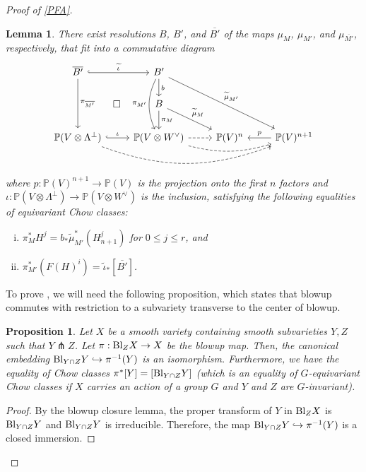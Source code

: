 \documentclass[12pt]{amsart}
\newcommand{\mb}{\mathbb}
\newcommand{\ol}{\overline}
\newcommand{\wt}{\widetilde}
\theoremstyle{plain}
\newtheorem{Lem}[Thm]{Lemma}
\newtheorem{Prop}[Thm]{Proposition}
\theoremstyle{definition}
\theoremstyle{remark}
\begin{document}
\begin{proof}[Proof of \cref{PFA}]
\begin{Lem} \label{pushforwardkeylemma}
There exist resolutions $B$, $B'$, and $\overline{B'}$ of the maps $\mu_{M}$, $\mu_{M'}$, and $\mu_{\overline{M'}}$, respectively, that fit into a commutative diagram
\begin{equation} \label{pushforwardkeydiagram}
\begin{tikzcd}
\overline{B'}\arrow[ddr, phantom, "\square", description, font=\normalsize]\arrow[r,hook,"\wt{\iota}"]\arrow[dd,"\pi_{\ol{M'}}"]&B'\arrow[dd,bend right=25, swap, "\pi_{M'}"]\arrow[d,"b"]\arrow[ddrr,"\wt{\mu}_{M'}"]&&\\
&B\arrow[d,"\pi_M"]\arrow[dr,"\wt{\mu}_M"]&&\\
\mb{P}(V \otimes \Lambda^{\perp})\arrow[rrr,dashed,bend right=20]\arrow[r,hook,"\iota"]&\mb{P}(V \otimes W^\vee)\arrow[r,dashed]\arrow[rr,dashed,bend right=15]&\mb{P}(V)^n&\mb{P}(V)^{n+1}\arrow[l,swap,"p"]
\end{tikzcd}
\end{equation}
where $p : \mb{P}(V)^{n+1} \to \mb{P}(V)$ is the projection onto the first $n$ factors and $\iota : \mb{P}(V \otimes \Lambda^\perp) \to \mb{P}(V \otimes W^\vee)$ is the inclusion, satisfying the following equalities of equivariant Chow classes:
\begin{enumerate}[(i)]
\item $\pi_M^* H^j = b_*\wt{\mu}_{M'}^* (H_{n+1}^j)$ for $0 \leq j \leq r$, and
\item $\pi_{M'}^{*} (F(H)^i)  = \wt{\iota}_*[\overline{B'}]$.
\end{enumerate}
\end{Lem}
To prove , we will need the following proposition, which states that blowup commutes with restriction to a subvariety transverse to the center of blowup.
\begin{Prop}
\label{BUR}
Let $X$ be a smooth variety containing smooth subvarieties $Y,Z$ such that $Y\pitchfork Z$. Let $\pi: {\rm Bl}_Z X\to X$ be the blowup map. Then, the canonical embedding ${\rm Bl}_{Y\cap Z} Y\hookrightarrow \pi^{-1}(Y)$ is an isomorphism. Furthermore, we have the equality of Chow classes $\pi^*[Y] = [{\rm Bl}_{Y\cap Z} Y]$ (which is an equality of $G$-equivariant Chow classes if $X$ carries an action of a group $G$ and $Y$ and $Z$ are $G$-invariant).
\end{Prop}
\begin{proof}
By the blowup closure lemma, the proper transform of $Y$ in ${\rm Bl}_Z X$ is ${\rm Bl}_{Y\cap Z} Y$ and ${\rm Bl}_{Y\cap Z} Y$ is irreducible. Therefore, the map ${\rm Bl}_{Y\cap Z} Y\hookrightarrow \pi^{-1}(Y)$ is a closed immersion.


\end{proof}
\end{proof}
\end{document}
